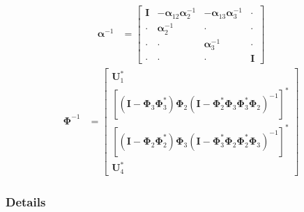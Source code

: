 \documentclass[letterpaper,10pt,english]{jupyterBook}
\begin{document}
\begin{equation*}
\begin{split}\boldsymbol\alpha^{-1} & = 
\begin{bmatrix}
  \mathbf{I} &-\boldsymbol\alpha_{12}\boldsymbol\alpha_{2 }^{-1}      &-\boldsymbol\alpha_{13}\boldsymbol\alpha_{3 }^{-1}      & \cdot \\
  \cdot      & \boldsymbol\alpha_{2 }^{-1} & \cdot                       & \cdot \\
  \cdot      & \cdot                       & \boldsymbol\alpha_{3 }^{-1} & \cdot \\
  \cdot      & \cdot                       & \cdot                       & \mathbf{I}
\end{bmatrix}\end{split}
\end{equation*}\begin{equation*}
\begin{split}\boldsymbol\Phi^{-1} & =
\begin{bmatrix}
  \mathbf{U}_1^* \\
  \left[ \left( \mathbf{I} - \boldsymbol\Phi_3 \boldsymbol\Phi_3^* \right) \boldsymbol\Phi_2 \left( \mathbf{I} - \boldsymbol\Phi_2^* \boldsymbol\Phi_3 \boldsymbol\Phi_3^* \boldsymbol\Phi_2 \right)^{-1} \right]^* \\
  \left[ \left( \mathbf{I} - \boldsymbol\Phi_2 \boldsymbol\Phi_2^* \right) \boldsymbol\Phi_3 \left( \mathbf{I} - \boldsymbol\Phi_3^* \boldsymbol\Phi_2 \boldsymbol\Phi_2^* \boldsymbol\Phi_3 \right)^{-1} \right]^* \\
  \mathbf{U}_4^* 
\end{bmatrix}
\end{split}
\end{equation*}\subsubsection*{Details}
\end{document}
